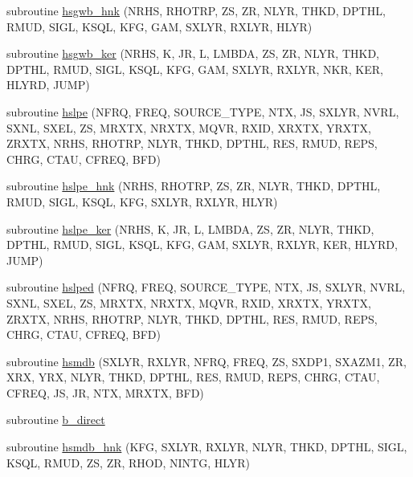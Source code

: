 \begin{DoxyCompactItemize}
\item 
subroutine \hyperlink{Leroi_8f90_a8e78b7efe3dc41645eaf9123100f4fc1}{hsgwb\+\_\+hnk} (N\+R\+HS, R\+H\+O\+T\+RP, ZS, ZR, N\+L\+YR, T\+H\+KD, D\+P\+T\+HL, R\+M\+UD, S\+I\+GL, K\+S\+QL, K\+FG, G\+AM, S\+X\+L\+YR, R\+X\+L\+YR, H\+L\+YR)
\item 
subroutine \hyperlink{Leroi_8f90_ad4730d65d0e42fe38f0f174339af3c71}{hsgwb\+\_\+ker} (N\+R\+HS, K, JR, L, L\+M\+B\+DA, ZS, ZR, N\+L\+YR, T\+H\+KD, D\+P\+T\+HL, R\+M\+UD, S\+I\+GL, K\+S\+QL, K\+FG, G\+AM, S\+X\+L\+YR, R\+X\+L\+YR, N\+KR, K\+ER, H\+L\+Y\+RD, J\+U\+MP)
\item 
subroutine \hyperlink{Leroi_8f90_a918a25836d554d239ee900a00fbefbb6}{hslpe} (N\+F\+RQ, F\+R\+EQ, S\+O\+U\+R\+C\+E\+\_\+\+T\+Y\+PE, N\+TX, JS, S\+X\+L\+YR, N\+V\+RL, S\+X\+NL, S\+X\+EL, ZS, M\+R\+X\+TX, N\+R\+X\+TX, M\+Q\+VR, R\+X\+ID, X\+R\+X\+TX, Y\+R\+X\+TX, Z\+R\+X\+TX, N\+R\+HS, R\+H\+O\+T\+RP, N\+L\+YR, T\+H\+KD, D\+P\+T\+HL, R\+ES, R\+M\+UD, R\+E\+PS, C\+H\+RG, C\+T\+AU, C\+F\+R\+EQ, B\+FD)
\item 
subroutine \hyperlink{Leroi_8f90_adae61b12e3735bac162cd8f39a3607d3}{hslpe\+\_\+hnk} (N\+R\+HS, R\+H\+O\+T\+RP, ZS, ZR, N\+L\+YR, T\+H\+KD, D\+P\+T\+HL, R\+M\+UD, S\+I\+GL, K\+S\+QL, K\+FG, S\+X\+L\+YR, R\+X\+L\+YR, H\+L\+YR)
\item 
subroutine \hyperlink{Leroi_8f90_ae58b6750741316da9a6a86b44785fa58}{hslpe\+\_\+ker} (N\+R\+HS, K, JR, L, L\+M\+B\+DA, ZS, ZR, N\+L\+YR, T\+H\+KD, D\+P\+T\+HL, R\+M\+UD, S\+I\+GL, K\+S\+QL, K\+FG, G\+AM, S\+X\+L\+YR, R\+X\+L\+YR, K\+ER, H\+L\+Y\+RD, J\+U\+MP)
\item 
subroutine \hyperlink{Leroi_8f90_a1965f18ad74a78ddcda474fa4268445f}{hslped} (N\+F\+RQ, F\+R\+EQ, S\+O\+U\+R\+C\+E\+\_\+\+T\+Y\+PE, N\+TX, JS, S\+X\+L\+YR, N\+V\+RL, S\+X\+NL, S\+X\+EL, ZS, M\+R\+X\+TX, N\+R\+X\+TX, M\+Q\+VR, R\+X\+ID, X\+R\+X\+TX, Y\+R\+X\+TX, Z\+R\+X\+TX, N\+R\+HS, R\+H\+O\+T\+RP, N\+L\+YR, T\+H\+KD, D\+P\+T\+HL, R\+ES, R\+M\+UD, R\+E\+PS, C\+H\+RG, C\+T\+AU, C\+F\+R\+EQ, B\+FD)
\item 
subroutine \hyperlink{Leroi_8f90_a48d6fa7ecaca60caaf9ecba957eaa3b1}{hsmdb} (S\+X\+L\+YR, R\+X\+L\+YR, N\+F\+RQ, F\+R\+EQ, ZS, S\+X\+D\+P1, S\+X\+A\+Z\+M1, ZR, X\+RX, Y\+RX, N\+L\+YR, T\+H\+KD, D\+P\+T\+HL, R\+ES, R\+M\+UD, R\+E\+PS, C\+H\+RG, C\+T\+AU, C\+F\+R\+EQ, JS, JR, N\+TX, M\+R\+X\+TX, B\+FD)
\item 
subroutine \hyperlink{Leroi_8f90_a485defa6db785c79bb6a092cd797ca0e}{b\+\_\+direct}
\item 
subroutine \hyperlink{Leroi_8f90_aa0252ede97751947c4c840de4179175d}{hsmdb\+\_\+hnk} (K\+FG, S\+X\+L\+YR, R\+X\+L\+YR, N\+L\+YR, T\+H\+KD, D\+P\+T\+HL, S\+I\+GL, K\+S\+QL, R\+M\+UD, ZS, ZR, R\+H\+OD, N\+I\+N\+TG, H\+L\+YR)

\end{DoxyCompactItemize}
